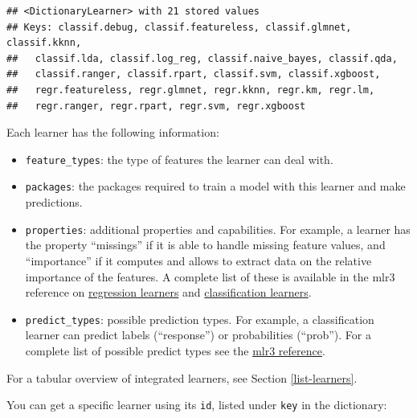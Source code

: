 \documentclass[]{scrbook}
\newenvironment{Shaded}{\begin{snugshade}}{\end{snugshade}}
\newcommand{\KeywordTok}[1]{\textcolor[rgb]{0.13,0.29,0.53}{\textbf{#1}}}
\newcommand{\NormalTok}[1]{#1}
\newcommand{\OperatorTok}[1]{\textcolor[rgb]{0.81,0.36,0.00}{\textbf{#1}}}
\newcommand{\StringTok}[1]{\textcolor[rgb]{0.31,0.60,0.02}{#1}}
\providecommand{\tightlist}{%
  \setlength{\itemsep}{0pt}\setlength{\parskip}{0pt}}
\renewenvironment{Shaded} {\begin{snugshade}\small} {\end{snugshade}}
\begin{document}
\begin{verbatim}
## <DictionaryLearner> with 21 stored values
## Keys: classif.debug, classif.featureless, classif.glmnet, classif.kknn,
##   classif.lda, classif.log_reg, classif.naive_bayes, classif.qda,
##   classif.ranger, classif.rpart, classif.svm, classif.xgboost,
##   regr.featureless, regr.glmnet, regr.kknn, regr.km, regr.lm,
##   regr.ranger, regr.rpart, regr.svm, regr.xgboost
\end{verbatim}

Each learner has the following information:

\begin{itemize}
\tightlist
\item
  \texttt{feature\_types}: the type of features the learner can deal with.
\item
  \texttt{packages}: the packages required to train a model with this learner and make predictions.
\item
  \texttt{properties}: additional properties and capabilities.
  For example, a learner has the property ``missings'' if it is able to handle missing feature values, and ``importance'' if it computes and allows to extract data on the relative importance of the features.
  A complete list of these is available in the mlr3 reference on \href{https://mlr3.mlr-org.com/reference/LearnerRegr.html\#construction}{regression learners} and \href{https://mlr3.mlr-org.com/reference/LearnerClassif.html\#construction}{classification learners}.
\item
  \texttt{predict\_types}: possible prediction types. For example, a classification learner can predict labels (``response'') or probabilities (``prob''). For a complete list of possible predict types see the \href{https://mlr3.mlr-org.com/reference/Learner.html\#construction}{mlr3 reference}.
\end{itemize}

For a tabular overview of integrated learners, see Section \ref{list-learners}.

You can get a specific learner using its \texttt{id}, listed under \texttt{key} in the dictionary:

\begin{Shaded}
\end{Shaded}
\end{document}
